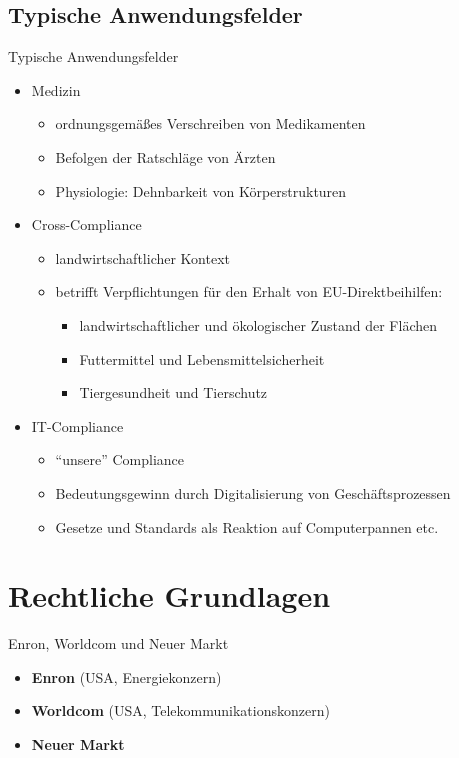 \documentclass[xcolor={usenames,dvipsnames}, compress, 10pt]{beamer}
\begin{document}
\subsection*{Typische Anwendungsfelder}

\begin{frame}{Typische Anwendungsfelder}
\pause
\begin{itemize}[<+->]
	\item Medizin
		\begin{itemize}[<+->]
			\item ordnungsgem\"a{\ss}es Verschreiben von Medikamenten
			\item Befolgen der Ratschl\"age von \"Arzten
			\item Physiologie: Dehnbarkeit von K\"orperstrukturen
		\end{itemize}
	\item Cross-Compliance
		\begin{itemize}[<+->]
			\item landwirtschaftlicher Kontext
			\item betrifft Verpflichtungen f\"ur den Erhalt von EU-Direktbeihilfen:
				\begin{itemize}[<+->]
					\item landwirtschaftlicher und \"okologischer Zustand der Fl\"achen
					\item Futtermittel und Lebensmittelsicherheit
					\item Tiergesundheit und Tierschutz
				\end{itemize}
		\end{itemize}
	\item IT-Compliance
	\begin{itemize}[<+->]
		\item "`unsere"' Compliance
		\item Bedeutungsgewinn durch Digitalisierung von Gesch\"aftsprozessen
		\item Gesetze und Standards als Reaktion auf Computerpannen etc.
	\end{itemize}
\end{itemize}
\end{frame}

\section{Rechtliche Grundlagen}

\begin{frame}{Enron, Worldcom und Neuer Markt}
\begin{itemize}
	\pause
	\item \textbf{Enron} (USA, Energiekonzern)
	\pause
	\item \textbf{Worldcom} (USA, Telekommunikationskonzern)
	\pause
	\item \textbf{Neuer Markt}
\end{itemize}
\end{frame}
\end{document}
